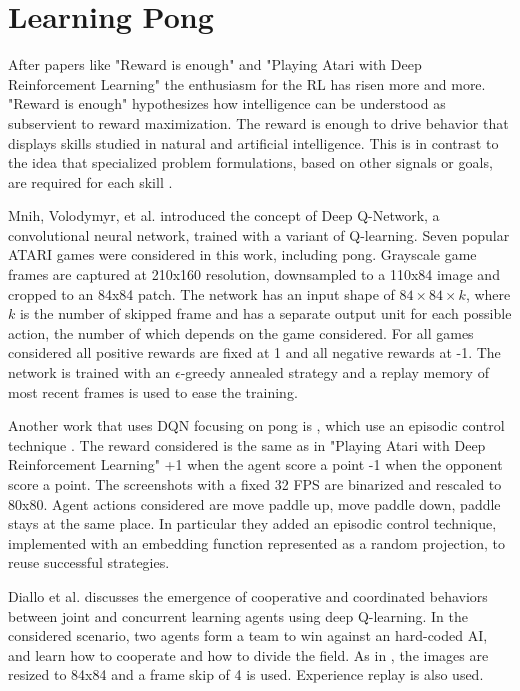 \section{Learning Pong}
After papers like "Reward is enough"\cite{silver2021reward} and "Playing Atari with Deep Reinforcement Learning"\cite{mnih2013playing} the enthusiasm for the RL has risen more and more.
"Reward is enough" hypothesizes how intelligence can be understood as subservient to reward maximization. The reward is enough to drive behavior that displays skills studied in natural and artificial intelligence. This is in contrast to the idea that specialized problem formulations, based on other signals or goals, are required for each skill \cite{silver2021reward}.

Mnih, Volodymyr, et al. \cite{mnih2013playing} introduced the concept of Deep Q-Network, a convolutional neural network, trained with a variant of Q-learning.
Seven popular ATARI games were considered in this work, including pong.
%
Grayscale game frames are captured at 210x160 resolution, downsampled to a 110x84 image and cropped to an 84x84 patch.
%
The network has an input shape of $84\times 84\times k$, where $k$ is the number of skipped frame and has a separate output unit for each possible action, 
the number of which depends on the game considered. 
For all games considered all positive rewards are fixed at 1 and all negative rewards at -1.
%
The network is trained with an $\epsilon$-greedy annealed strategy and a replay memory of most recent frames is used to ease the training.

Another work that uses DQN focusing on pong is \cite{makarov2017learning}, which use an episodic control technique \cite{blundell2016model}.
%
The reward considered is the same as in "Playing Atari with Deep Reinforcement Learning" +1 when the agent score a point -1 when the opponent score a point.
The screenshots with a fixed 32 FPS are binarized and rescaled to 80x80.
Agent actions considered are move paddle up, move paddle down, paddle stays at the same place.
In particular they added an episodic control technique, implemented with an embedding function represented as a random projection, to reuse successful strategies.


Diallo et al. \cite{diallo2017learning} discusses the emergence of cooperative and coordinated behaviors between joint and concurrent learning
agents using deep Q-learning. 
%
In the considered scenario, two agents form a team to win against an hard-coded AI,
and learn how to cooperate and how to divide the field.
%
As in \cite{mnih2013playing}, the images are resized to 84x84 and a frame skip of 4 is used.
Experience replay is also used.

